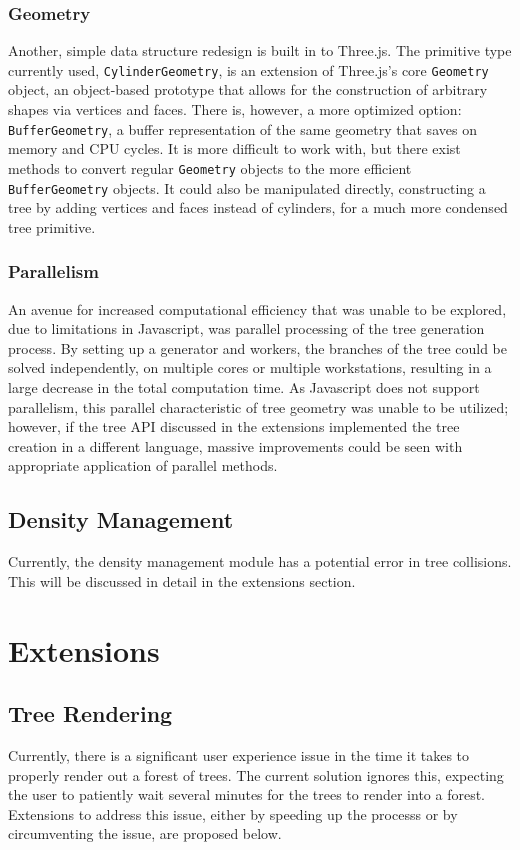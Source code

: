 \documentclass{article}
\newcommand{\tab}{\hspace*{2em}}
\begin{document}
            \subsubsection{Geometry}
    \tab Another, simple data structure redesign is built in to Three.js. The primitive type
currently used, \verb|CylinderGeometry|, is an extension of Three.js's core \verb|Geometry| object,
an object-based prototype that allows for the construction of arbitrary shapes via vertices and
faces. There is, however, a more optimized option: \verb|BufferGeometry|, a buffer representation
of the same geometry that saves on memory and CPU cycles. It is more difficult to work with, but
there exist methods to convert regular \verb|Geometry| objects to the more efficient
\verb|BufferGeometry| objects. It could also be manipulated directly, constructing a tree by adding
vertices and faces instead of cylinders, for a much more condensed tree primitive.

            \subsubsection{Parallelism}
    \tab An avenue for increased computational efficiency that was unable to be explored, due to
limitations in Javascript, was parallel processing of the tree generation process. By setting up a
generator and workers, the branches of the tree could be solved independently, on multiple cores or
multiple workstations, resulting in a large decrease in the total computation time. As Javascript
does not support parallelism, this parallel characteristic of tree geometry was unable to be
utilized; however, if the tree API discussed in the extensions implemented the tree creation in a
different language, massive improvements could be seen with appropriate application of parallel
methods.

        \subsection{Density Management}
    \tab Currently, the density management module has a potential error in tree collisions. This
will be discussed in detail in the extensions section.

    \section{Extensions}
        \subsection{Tree Rendering}
    \tab Currently, there is a significant user experience issue in the time it takes to properly
render out a forest of trees. The current solution ignores this, expecting the user to patiently
wait several minutes for the trees to render into a forest. Extensions to address this issue,
either by speeding up the processs or by circumventing the issue, are proposed below.
\end{document}
